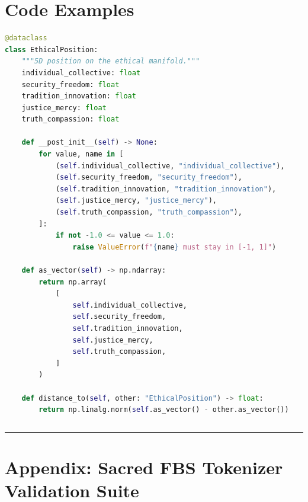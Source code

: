 \documentclass[12pt]{article}
\begin{document}
\section{\texorpdfstring{\textbf{Code
Examples}}{Code Examples}}\label{code-examples}

\begin{lstlisting}[language=Python, basicstyle=\ttfamily\small]
@dataclass
class EthicalPosition:
    """5D position on the ethical manifold."""
    individual_collective: float
    security_freedom: float
    tradition_innovation: float
    justice_mercy: float
    truth_compassion: float

    def __post_init__(self) -> None:
        for value, name in [
            (self.individual_collective, "individual_collective"),
            (self.security_freedom, "security_freedom"),
            (self.tradition_innovation, "tradition_innovation"),
            (self.justice_mercy, "justice_mercy"),
            (self.truth_compassion, "truth_compassion"),
        ]:
            if not -1.0 <= value <= 1.0:
                raise ValueError(f"{name} must stay in [-1, 1]")

    def as_vector(self) -> np.ndarray:
        return np.array(
            [
                self.individual_collective,
                self.security_freedom,
                self.tradition_innovation,
                self.justice_mercy,
                self.truth_compassion,
            ]
        )

    def distance_to(self, other: "EthicalPosition") -> float:
        return np.linalg.norm(self.as_vector() - other.as_vector())
\end{lstlisting}

\begin{verbatim}
\end{verbatim}

\begin{center}\rule{0.5\linewidth}{0.5pt}\end{center}

\section{Appendix: Sacred FBS Tokenizer Validation
Suite}\label{appendix-sacred-fbs-tokenizer-validation-suite}
\end{document}
